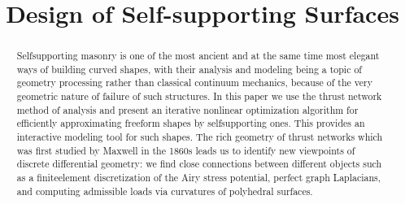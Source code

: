 \documentclass[annual]{acmsiggraph}
\title{Design of Self-supporting Surfaces}
\begin{document}



\maketitle


\begin{abstract}
Self\dash supporting masonry is one of the most ancient and at the same
time most elegant ways of building curved shapes, with their analysis and
modeling being a topic of geometry processing
rather than classical continuum mechanics, because of the very geometric
nature of failure of such structures. In this paper we use the
thrust network method of analysis and present 
an iterative nonlinear optimization algorithm for efficiently approximating freeform shapes
by self\dash supporting ones. This provides an interactive
modeling tool for such shapes. The rich geometry of thrust networks which
was first studied by Maxwell in the 1860s leads us to identify new viewpoints
of discrete differential geometry: we find close connections between different
objects such as a finite\dash element discretization of the Airy stress
potential, perfect graph Laplacians, and computing admissible loads
via curvatures of polyhedral surfaces.

\end{abstract}
\end{document}
